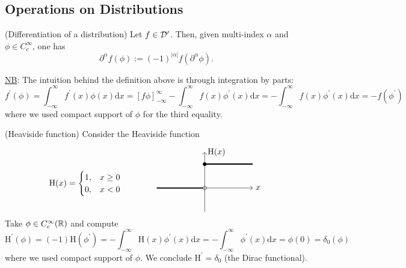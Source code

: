 \documentclass[11pt]{article}
\begin{document}
		
		\subsection{Operations on Distributions}

			\begin{defi}
				(Differentiation of a distribution) Let $f\in\mathcal{D}^\prime$. Then, given multi-index $\alpha$ and $\phi\in C^\infty_c$, one has 
				\begin{equation*}
					\partial^\alpha f(\phi):=(-1)^{|\alpha|}f(\partial^\alpha\phi).
				\end{equation*}
			\end{defi}

			\noindent\underline{NB}: The intuition behind the definition above is through integration by parts: 
			\begin{equation*}
				f^\prime(\phi)=\int_{-\infty}^\infty f^\prime(x)\phi(x)\mathrm{d}x=\left[f\phi\right]^\infty_{-\infty}-\int_{-\infty}^\infty f(x)\phi^\prime(x)\mathrm{d}x=-\int_{-\infty}^\infty f(x)\phi^\prime(x)\mathrm{d}x=-f(\phi^\prime)
			\end{equation*}
			where we used compact support of $\phi$ for the third equality.

			\begin{eg}
				(Heaviside function) Consider the Heaviside function
				\begin{equation*}
					\mathrm{H}(x)=\begin{cases}
						1, & x\ge0\\
						0, & x<0
					\end{cases}\qquad\qquad 
					\begin{tikzpicture}[baseline=.1cm]
						\draw[->] (-2,0)--(2,0) node [right]{$x$};
						\draw[->] (0,-1)--(0,1.5) node [right]{$\mathrm{H}(x)$};
						\draw[line width=.5mm] (-2,0)--(-.08,0);
						\draw[line width=.5mm] (0,1)--(2,1);
						\draw[] (0,0) circle [radius=.08cm];
						\fill (0,1) circle [radius=.08cm];
					\end{tikzpicture}
				\end{equation*}
				Take $\phi\in C^\infty_c(\mathbb{R})$ and compute
				\begin{equation*}
					\mathrm{H}^\prime(\phi)=(-1)\mathrm{H}(\phi^\prime)=-\int_{-\infty}^{\infty}\mathrm{H}(x)\phi^\prime(x)\mathrm{d}x=-\int_{-\infty}^\infty\phi^\prime(x)\mathrm{d}x=\phi(0)=\delta_0(\phi)	
				\end{equation*}
				where we used compact support of $\phi$. We conclude $\mathrm{H}^\prime=\delta_0$ (the Dirac functional).
			\end{eg}
\end{document}
